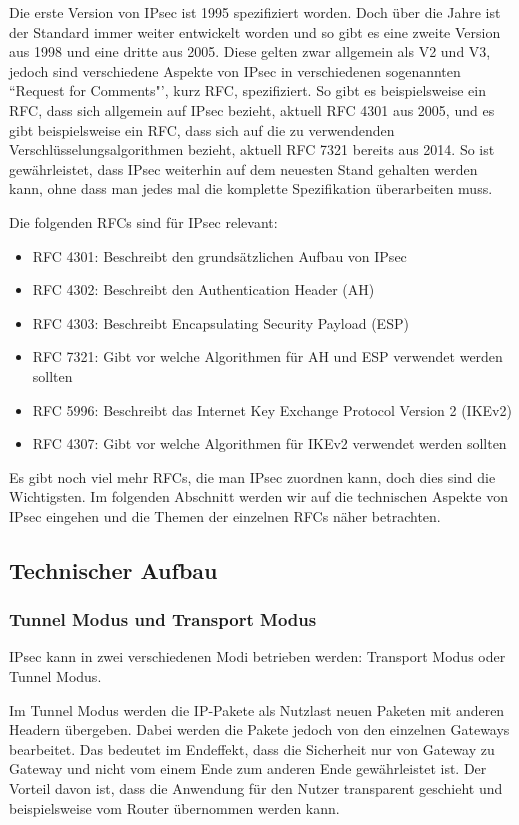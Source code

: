 \documentclass[12pt]{scrartcl}
\begin{document}
Die erste Version von IPsec ist 1995\cite{RFC1825} spezifiziert worden. Doch über die Jahre ist der Standard immer weiter entwickelt worden und so gibt es eine zweite Version aus 1998\cite{RFC2401} und eine dritte aus 2005\cite{RFC4301}. Diese gelten zwar allgemein als V2 und V3, jedoch sind verschiedene Aspekte von IPsec in verschiedenen sogenannten ``Request for Comments"', kurz RFC, spezifiziert. So gibt es beispielsweise ein RFC, dass sich allgemein auf IPsec bezieht, aktuell RFC 4301 aus 2005, und es gibt beispielsweise ein RFC, dass sich auf die zu verwendenden Verschlüsselungsalgorithmen bezieht, aktuell RFC 7321 bereits aus 2014. So ist gewährleistet, dass IPsec weiterhin auf dem neuesten Stand gehalten werden kann, ohne dass man jedes mal die komplette Spezifikation überarbeiten muss.

Die folgenden RFCs sind für IPsec relevant:
\begin{itemize}
\item RFC 4301: Beschreibt den grundsätzlichen Aufbau von IPsec\cite{RFC4301}
\item RFC 4302: Beschreibt den Authentication Header (AH)\cite{RFC4302}
\item RFC 4303: Beschreibt Encapsulating Security Payload (ESP)\cite{RFC4303}
\item RFC 7321: Gibt vor welche Algorithmen für AH und ESP verwendet werden sollten\cite{RFC7321}
\item RFC 5996: Beschreibt das Internet Key Exchange Protocol Version 2 (IKEv2)\cite{RFC5996}
\item RFC 4307: Gibt vor welche Algorithmen für IKEv2 verwendet werden sollten\cite{RFC4307}
\end{itemize}
Es gibt noch viel mehr RFCs, die man IPsec zuordnen kann, doch dies sind die Wichtigsten. Im folgenden Abschnitt werden wir auf die technischen Aspekte von IPsec eingehen und die Themen der einzelnen RFCs näher betrachten.

\subsection{Technischer Aufbau}
\subsubsection{Tunnel Modus und Transport Modus}
IPsec kann in zwei verschiedenen Modi betrieben werden: Transport Modus oder Tunnel Modus. \cite{RFC4301}

Im Tunnel Modus werden die IP-Pakete als Nutzlast neuen Paketen mit anderen Headern übergeben. Dabei werden die Pakete jedoch von den einzelnen Gateways bearbeitet. Das bedeutet im Endeffekt, dass die Sicherheit nur von Gateway zu Gateway und nicht vom einem Ende zum anderen Ende gewährleistet ist. Der Vorteil davon ist, dass die Anwendung für den Nutzer transparent geschieht und beispielsweise vom Router übernommen werden kann.
\end{document}
